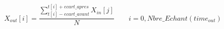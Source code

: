 \[
X_{out}[i] = \frac{
\displaystyle{\sum_{t[i] - ecart\_avant}^{t[i] + ecart\_apres} X_{in}[j]} }
{N} 
\qquad i=0,Nbre\_Echant(time_{out})
\]

